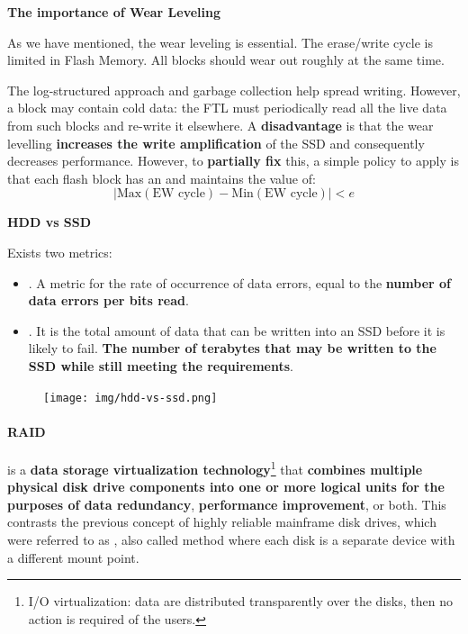 \begin{flushleft}
    \textcolor{Green3}{ \textbf{The importance of Wear Leveling}}
\end{flushleft}
As we have mentioned, the wear leveling is essential. The erase/write cycle is limited in Flash Memory. All blocks should wear out roughly at the same time.

\highspace
The log-structured approach and garbage collection help spread writing. However, a block may contain cold data: the FTL must periodically read all the live data from such blocks and re-write it elsewhere.
A \textbf{disadvantage} is that the wear levelling \textbf{increases the write amplification} of the SSD and consequently decreases performance. However, to \textbf{partially fix} this, a simple policy to apply is that each flash block has an  and maintains the value of:
\begin{equation}
    \left| \mathrm{Max}\left(\text{EW cycle}\right) - \mathrm{Min}\left(\text{EW cycle}\right) \right| < e
\end{equation}

\begin{flushleft}
    \textcolor{Red2}{\textbf{HDD vs SSD}}
\end{flushleft}
Exists two metrics:
\begin{itemize}
    \item {}. A metric for the rate of occurrence of data errors, equal to the \textbf{number of data errors per bits read}.
    
    \item {}. It is the total amount of data that can be written into an SSD before it is likely to fail. \textbf{The number of terabytes that may be written to the SSD while still meeting the requirements}.
\end{itemize}
\begin{figure}[!htp]
    \centering
    \texttt{[image: img/hdd-vs-ssd.png]}
\end{figure}

\newpage

\paragraph{RAID}\label{paragraph: RAID}

 is a \textbf{data storage virtualization technology}\footnote{I/O virtualization: data are distributed transparently over the disks, then no action is required of the users.} that \textbf{combines multiple physical disk drive components into one or more logical units for the purposes of data redundancy}, \textbf{performance improvement}, or both. This contrasts the previous concept of highly reliable mainframe disk drives, which were referred to as  , also called  method where each disk is a separate device with a different mount point.

